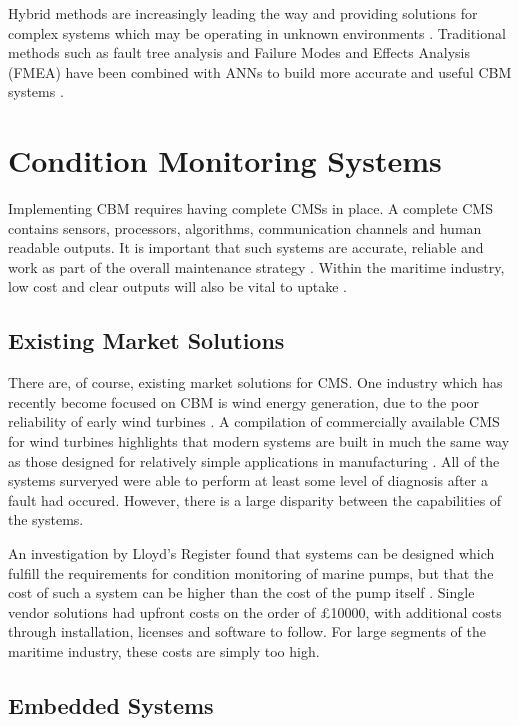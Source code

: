 Hybrid methods are increasingly leading the way and providing solutions for complex systems which may be operating in unknown environments \cite{CM_dai_gao_2013}\cite{CM_ship_ann}.
Traditional methods such as fault tree analysis and Failure Modes and Effects Analysis (FMEA) have been combined with ANNs to build more accurate and useful CBM systems \cite{CM_ship_ann}.


\section{Condition Monitoring Systems}

Implementing CBM requires having complete CMSs in place.
A complete CMS contains sensors, processors, algorithms, communication channels and human readable outputs.
It is important that such systems are accurate, reliable and work as part of the overall maintenance strategy \cite{CM_mcsa_vib}.
Within the maritime industry, low cost and clear outputs will also be vital to uptake \cite{CBM_beyond_maritime}.


\subsection{Existing Market Solutions}

There are, of course, existing market solutions for CMS.
One industry which has recently become focused on CBM is wind energy generation, due to the poor reliability of early wind turbines \cite{CM_practical_wind_turbine}.
A compilation of commercially available CMS for wind turbines highlights that modern systems are built in much the same way as those designed for relatively simple applications in manufacturing \cite{CM_list_wind_CMS}.
All of the systems surveryed were able to perform at least some level of diagnosis after a fault had occured.
However, there is a large disparity between the capabilities of the systems.
\par
An investigation by Lloyd's Register found that systems can be designed which fulfill the requirements for condition monitoring of marine pumps, but that the cost of such a system can be higher than the cost of the pump itself \cite{LR_cm_systems}.
Single vendor solutions had upfront costs on the order of £10000, with additional costs through installation, licenses and software to follow.
For large segments of the maritime industry, these costs are simply too high.


\subsection{Embedded Systems}

